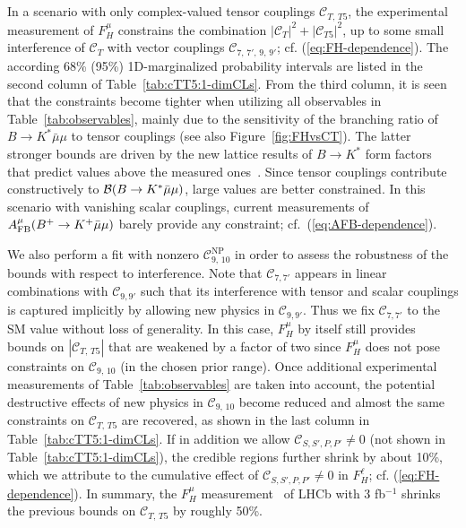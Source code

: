 \documentclass[twocolumn,epjc3]{svjour3}
\numberwithin{equation}{section}
\def \refeq#1{(\ref{#1})}
\def \reffig#1{Figure~\ref{#1}}
\def \reftab#1{Table~\ref{#1}}
\newcommand{\wilson}[2][{}]{\mathcal{C}_{#2}^{\mathrm{#1}}}
\renewcommand{\[}{\big[}
\renewcommand{\]}{\big]}
\renewcommand{\(}{\big(}
\renewcommand{\)}{\big)}
\begin{document}
In a scenario with only {complex-valued tensor couplings} $\wilson{T,\, T5}$, the
experimental measurement of $F_H^\mu$ constrains the combination $|\wilson{T}|^2
+ |\wilson{T5}|^2$, up to some small interference of $\wilson{T}$ with vector
couplings $\wilson{7,\,7',\,9,\,9'}$; cf. \refeq{eq:FH-dependence}.  The
according 68\% (95\%) 1D-marginalized probability intervals are listed in the
second column of \reftab{tab:cTT5:1-dimCLs}. From the third column, it is seen
that the constraints become tighter when utilizing all observables in
\reftab{tab:observables}, mainly due to the sensitivity of the branching ratio
of $B\to K^{*} \bar\mu\mu$ to tensor couplings (see also
\reffig{fig:FHvsCT}). The latter stronger bounds are driven by the new lattice
results of $B\to K^*$ form factors that predict values above the measured
{ones}~\cite{Horgan:2013pva}. Since tensor couplings contribute constructively
to ${\cal B}(B\to K^{*}\bar\mu\mu)$, large values are better constrained. In
this scenario with vanishing scalar couplings, current measurements of $A_{\rm
  FB}^\mu(B^+\to K^+\bar\mu\mu)$ barely provide any constraint;
cf.~\refeq{eq:AFB-dependence}.

We also perform a fit with nonzero $\wilson[NP]{9,\,10}$ in order to assess the
robustness of the bounds with respect to interference. Note that $\wilson{7,7'}$
appears in linear combinations with $\wilson{9,9'}$ such that its interference
with tensor and scalar couplings is captured implicitly by allowing new physics
in $\wilson{9,9'}$. Thus we fix $\wilson{7,7'}$ to the SM value without loss of
generality. In this case, $F_H^\mu$ by itself still provides bounds on
$|\wilson{T,\,T5}|$ that are weakened by a factor of two since $F_H^\mu$ does
not pose constraints on $\wilson{9,\,10}$ (in the chosen prior range). Once
additional experimental measurements of \reftab{tab:observables} are taken into
account, the potential destructive effects of new physics in $\wilson{9,\,10}$
become reduced and almost the same constraints on $\wilson{T,\,T5}$ are
recovered, as shown in the last column in \reftab{tab:cTT5:1-dimCLs}. If in
addition we allow $\wilson{S,S',P,P'} \ne 0$ (not shown in
\reftab{tab:cTT5:1-dimCLs}), the credible regions further shrink by about 10\%,
which we attribute to {the} cumulative effect of $\wilson{S,S',P,P'} \ne 0$ in
$F_H^\ell$; cf. \refeq{eq:FH-dependence}. In summary, the $F_H^\mu$
measurement~\cite{Aaij:2014tfa} of LHCb with 3 fb$^{-1}$ shrinks the previous
bounds \cite{Bobeth:2012vn} on $\wilson{T,\,T5}$ by roughly 50\%.
\end{document}
